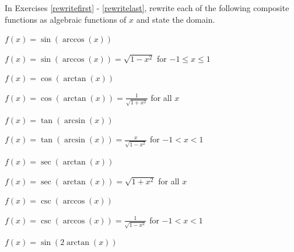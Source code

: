 \documentclass{ximera}
\begin{document}
\begin{question}

In Exercises \ref{rewritefirst} - \ref{rewritelast}, rewrite each of the following composite functions as algebraic functions of $x$ and state the domain.

\begin{problem} \label{rewritefirst}
$f(x) = \sin \left( \arccos \left( x \right) \right)$ 

\begin{solution}
$f(x) = \sin \left( \arccos \left( x \right) \right) = \sqrt{1 - x^{2}}$  for $-1 \leq x \leq 1$
\end{solution}
\end{problem}

\begin{problem}
$f(x) = \cos \left( \arctan \left( x \right) \right)$

\begin{solution}
$f(x) = \cos \left( \arctan \left( x \right) \right) = \frac{1}{\sqrt{1 + x^{2}}}$ for all $x$
\end{solution}
\end{problem}

\begin{problem}
$f(x) = \tan \left( \arcsin \left( x \right) \right)$

\begin{solution}
$f(x) =\tan \left( \arcsin \left( x \right) \right) = \frac{x}{\sqrt{1 - x^{2}}}$  for $-1 < x < 1$
\end{solution}
\end{problem}

\begin{problem}
$f(x) = \sec \left( \arctan \left( x \right) \right)$

\begin{solution}
$f(x) =\sec \left( \arctan \left( x \right) \right) = \sqrt{1 + x^{2}}$ for all $x$
\end{solution}
\end{problem}

\begin{problem}
$f(x) = \csc \left( \arccos \left( x \right) \right)$

\begin{solution}
$f(x) =\csc \left( \arccos \left( x \right) \right) = \frac{1}{\sqrt{1 - x^{2}}}$ for $-1 < x < 1$
\end{solution}
\end{problem}

\begin{problem}
$f(x) = \sin \left( 2 \arctan \left( x \right) \right)$ 


\end{problem}
\end{question}
\end{document}
